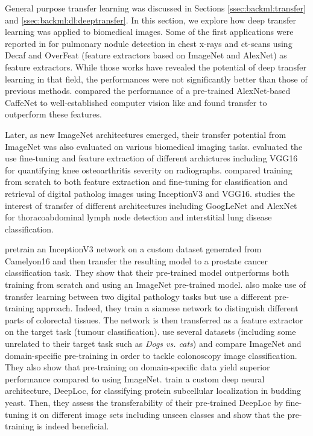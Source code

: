 General purpose transfer learning was discussed in Sections \ref{ssec:backml:transfer} and \ref{ssec:backml:dl:deeptransfer}. In this section, we explore how deep transfer learning was applied to biomedical images. Some of the first applications were reported in \parencite{bar2015chest,ciompi2015automatic,van2015off} for pulmonary nodule detection in chest x-rays and \acrshort{ct}-scans using Decaf and OverFeat (feature extractors based on ImageNet and AlexNet) as feature extractors. While those works have revealed the potential of deep transfer learning in that field, the performances were not significantly better than those of previous methods. \parencite{ravishankar2016understanding} compared the performance of a pre-trained AlexNet-based CaffeNet \parencite{jia2014caffe} to well-established computer vision like  \parencite{mcconnell1986method} and found transfer to outperform these features.

Later, as new ImageNet architectures emerged, their transfer potential from ImageNet was also evaluated on various biomedical imaging tasks. \parencite{antony2016quantifying} evaluated the use fine-tuning and feature extraction of different archictures including VGG16 for quantifying knee osteoarthritis severity on radiographs. \parencite{kieffer2017convolutional} compared training from scratch to both feature extraction and fine-tuning for classification and retrieval of digital patholog images using InceptionV3 and VGG16.  \parencite{shin2016deep} studies the interest of transfer of different architectures including GoogLeNet and AlexNet for thoracoabdominal lymph node detection and interstitial lung disease classification. 

\parencite{mensink2021factors}


\parencite{khan2019improving} pretrain an InceptionV3 network on a custom dataset generated from Camelyon16 and then transfer the resulting model to a prostate cancer classification task. They show that their pre-trained model outperforms both training from scratch and using an ImageNet pre-trained model. \etal \parencite{medela2019few} also make use of transfer learning between two digital pathology tasks but use a different pre-training approach. Indeed, they train a siamese network to distinguish different parts of colorectal tissues. The network is then transferred as a feature extractor on the target task (tumour classification). \parencite{shang2019and} use several datasets (including some unrelated to their target task such as \textit{Dogs vs. cats}) and compare ImageNet and domain-specific pre-training in order to tackle colonoscopy image classification. They also show that pre-training on domain-specific data yield superior performance compared to using ImageNet. \parencite{kraus2017automated} train a custom deep neural architecture, DeepLoc, for classifying protein subcellular localization in budding yeast. Then, they assess the transferability of their pre-trained DeepLoc by fine-tuning it on different image sets including unseen classes and show that the pre-training is indeed beneficial.




